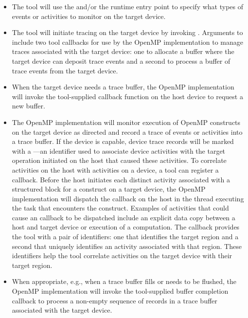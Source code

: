 \begin{itemize}
\item The tool will use the 
  and/or the  runtime entry point to specify what
  types of events or activities to monitor on the target device.
\item The tool will initiate tracing on the target device by 
  invoking . Arguments to 
  include two tool callbacks for use by the OpenMP implementation to manage
  traces associated with the target device: one to allocate
  a buffer where the target device can deposit trace events and a
  second to process a buffer of trace events from the target device. 
\item When the target device needs a trace buffer, the OpenMP implementation 
  will invoke the tool-supplied callback function on the host device to request a new buffer.
\item The OpenMP implementation will monitor execution of OpenMP constructs on the target device as
  directed and record a trace of events or activities into a trace
  buffer. If the device is capable, device trace records will be
  marked with a ---an identifier used to associate
  device activities with the target operation initiated on the host
  that caused these activities.  To correlate activities on the host
  with activities on a device, a tool can register a
   callback. 
  Before the host initiates each distinct activity associated with a structured block for a  construct
  on a target device, the OpenMP implementation will dispatch the  callback
  on the host in the thread executing the task that encounters the  construct. 
  Examples of activities that could cause an  callback to be dispatched
  include an explicit data copy between a host and target device or execution of a computation.
  The callback provides the tool with a pair of identifiers: one that identifies the target region and a second
  that uniquely identifies an activity associated with that region.  
  These identifiers help the tool correlate activities on the target device with their target region.
\item When appropriate, e.g., when a trace buffer fills or needs to be
  flushed, the OpenMP implementation will invoke the tool-supplied buffer
  completion callback to process a non-empty sequence of
  records in a trace buffer associated with the target device.


\end{itemize}
